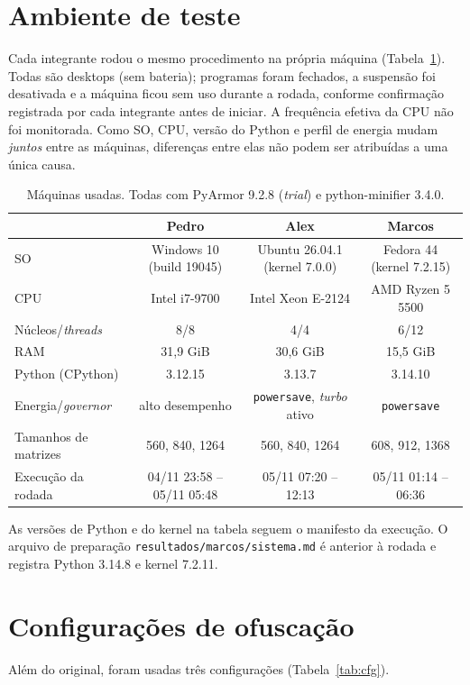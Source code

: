 \documentclass[12pt]{article}
\begin{document}
\section{Ambiente de teste}
Cada integrante rodou o mesmo procedimento na própria máquina (Tabela~\ref{tab:amb}). Todas são desktops
(sem bateria); programas foram fechados, a suspensão foi desativada e a máquina ficou sem uso durante a rodada,
conforme confirmação registrada por cada integrante antes de iniciar. A frequência efetiva da CPU não foi
monitorada. Como SO, CPU, versão do Python e perfil de energia mudam \emph{juntos} entre as máquinas, diferenças
entre elas não podem ser atribuídas a uma única causa.

\begin{table}[!htbp]\centering\scriptsize\setlength{\tabcolsep}{3pt}
\caption{Máquinas usadas. Todas com PyArmor 9.2.8 (\emph{trial}) e python-minifier 3.4.0.}\label{tab:amb}
\begin{tabular}{lccc}\hline
 & Pedro & Alex & Marcos \\\hline
SO & Windows 10 (build 19045) & Ubuntu 26.04.1 (kernel 7.0.0) & Fedora 44 (kernel 7.2.15) \\
CPU & Intel i7-9700 & Intel Xeon E-2124 & AMD Ryzen 5 5500 \\
Núcleos/\emph{threads} & 8/8 & 4/4 & 6/12 \\
RAM & 31,9 GiB & 30,6 GiB & 15,5 GiB \\
Python (CPython) & 3.12.15 & 3.13.7 & 3.14.10 \\
Energia/\emph{governor} & alto desempenho & \texttt{powersave}, \emph{turbo} ativo & \texttt{powersave} \\
Tamanhos de matrizes & 560, 840, 1264 & 560, 840, 1264 & 608, 912, 1368 \\
Execução da rodada & 04/11 23:58 -- 05/11 05:48 & 05/11 07:20 -- 12:13 & 05/11 01:14 -- 06:36 \\\hline
\end{tabular}
\end{table}
As versões de Python e do kernel na tabela seguem o manifesto da execução. O arquivo de preparação
\texttt{resultados/marcos/sistema.md} é anterior à rodada e registra Python 3.14.8 e kernel 7.2.11.

\section{Configurações de ofuscação}
Além do original, foram usadas três configurações (Tabela~\ref{tab:cfg}).
\end{document}
